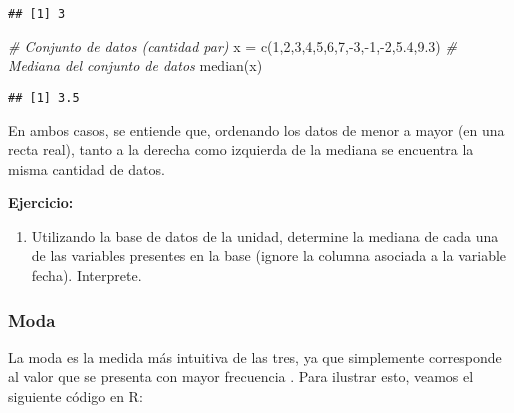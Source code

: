 \documentclass[
]{book}
\newenvironment{Shaded}{\begin{snugshade}}{\end{snugshade}}
\newcommand{\CommentTok}[1]{\textcolor[rgb]{0.56,0.35,0.01}{\textit{#1}}}
\newcommand{\DecValTok}[1]{\textcolor[rgb]{0.00,0.00,0.81}{#1}}
\newcommand{\FloatTok}[1]{\textcolor[rgb]{0.00,0.00,0.81}{#1}}
\newcommand{\FunctionTok}[1]{\textcolor[rgb]{0.00,0.00,0.00}{#1}}
\newcommand{\NormalTok}[1]{#1}
\newcommand{\OtherTok}[1]{\textcolor[rgb]{0.56,0.35,0.01}{#1}}
\newcommand{\SpecialCharTok}[1]{\textcolor[rgb]{0.00,0.00,0.00}{#1}}
\providecommand{\tightlist}{%
  \setlength{\itemsep}{0pt}\setlength{\parskip}{0pt}}
\begin{document}
\begin{verbatim}
## [1] 3
\end{verbatim}

\begin{Shaded}
\begin{Highlighting}[]
\CommentTok{\# Conjunto de datos (cantidad par)}
\NormalTok{x }\OtherTok{=} \FunctionTok{c}\NormalTok{(}\DecValTok{1}\NormalTok{,}\DecValTok{2}\NormalTok{,}\DecValTok{3}\NormalTok{,}\DecValTok{4}\NormalTok{,}\DecValTok{5}\NormalTok{,}\DecValTok{6}\NormalTok{,}\DecValTok{7}\NormalTok{,}\SpecialCharTok{{-}}\DecValTok{3}\NormalTok{,}\SpecialCharTok{{-}}\DecValTok{1}\NormalTok{,}\SpecialCharTok{{-}}\DecValTok{2}\NormalTok{,}\FloatTok{5.4}\NormalTok{,}\FloatTok{9.3}\NormalTok{)}
\CommentTok{\# Mediana del conjunto de datos}
\FunctionTok{median}\NormalTok{(x)}
\end{Highlighting}
\end{Shaded}

\begin{verbatim}
## [1] 3.5
\end{verbatim}

En ambos casos, se entiende que, ordenando los datos de menor a mayor (en una recta real), tanto a la derecha como izquierda de la mediana se encuentra la misma cantidad de datos.

\textbf{Ejercicio:}

\begin{enumerate}
\def\labelenumi{\arabic{enumi}.}
\tightlist
\item
  Utilizando la base de datos de la unidad, determine la mediana de cada una de las variables presentes en la base (ignore la columna asociada a la variable fecha). Interprete.
\end{enumerate}

\hypertarget{moda}{%
\subsubsection*{Moda}\label{moda}}

La moda es la medida más intuitiva de las tres, ya que simplemente corresponde al valor que se presenta con mayor frecuencia \citep[página 85]{anderson}. Para ilustrar esto, veamos el siguiente código en R:
\end{document}
